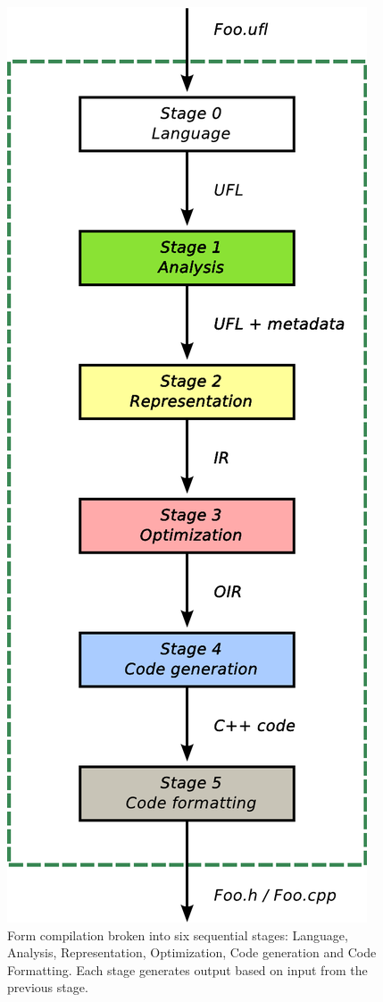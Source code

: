 \begin{figure}
\begin{center}
    \includegraphics[height=0.8\textheight]{chapters/logg-1/pdf/compilerdesign.pdf}
    \caption{Form compilation broken into six sequential stages:
      Language, Analysis, Representation, Optimization, Code
      generation and Code Formatting. Each stage generates output
      based on input from the previous stage.}
    \label{fig:logg-1:compilerstages}
  \end{center}
\end{figure}

